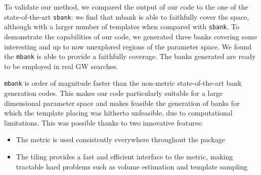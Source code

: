 \documentclass[twocolumn,showpacs,preprintnumbers,nofootinbib,prd,
superscriptaddress,10pt]{revtex4-2}
\begin{document}
To validate our method, we compared the output of our code to the one of the state-of-the-art \texttt{sbank}: we find that mbank is able to faithfully cover the space, although with a larger number of templates when compared with \texttt{sbank}.
To demonstrate the capabilities of our code, we generated three banks covering some interesting and up to now unexplored regions of the parameter space. We found the \texttt{mbank} is able to provide a faithfully coverage.
The banks generated are ready to be employed in real GW searches.

\texttt{mbank} is order of magnitude faster than the non-metric state-of-the-art bank generation codes. This makes our code particularly suitable for a large dimensional parameter space and makes feasible the generation of banks for which the template placing was hitherto unfeasible, due to computational limitations.
This was possible thanks to two innovative features:
\begin{itemize}
	\item The metric is used consistently everywhere throughout the package
	\item The tiling provides a fast and efficient interface to the metric, making tractable hard problems such as volume estimation and template sampling
\end{itemize}
\end{document}
